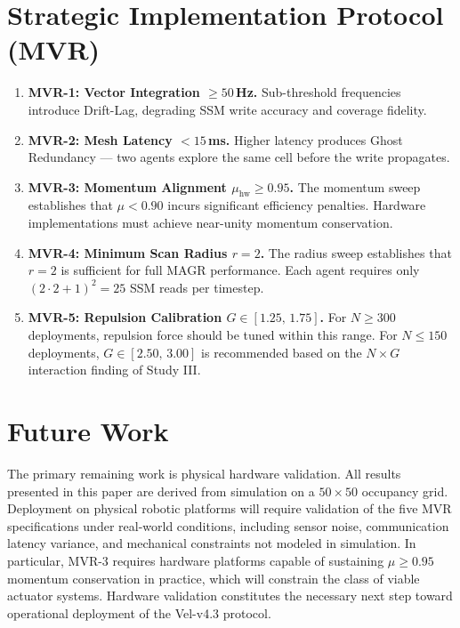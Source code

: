 \documentclass[journal,compsoc]{IEEEtran}
\begin{document}
\section{Strategic Implementation Protocol (MVR)}
\label{sec:mvr}

\begin{enumerate}
    \item \textbf{MVR-1: Vector Integration $\geq50$\,Hz.} Sub-threshold frequencies
          introduce Drift-Lag, degrading SSM write accuracy and coverage fidelity.
    \item \textbf{MVR-2: Mesh Latency $<15$\,ms.} Higher latency produces Ghost
          Redundancy --- two agents explore the same cell before the write propagates.
    \item \textbf{MVR-3: Momentum Alignment $\mu_{\text{hw}}\geq0.95$.} The momentum
          sweep establishes that $\mu<0.90$ incurs significant efficiency penalties.
          Hardware implementations must achieve near-unity momentum conservation.
    \item \textbf{MVR-4: Minimum Scan Radius $r=2$.} The radius sweep establishes
          that $r=2$ is sufficient for full MAGR performance. Each agent requires
          only $(2\cdot2+1)^2=25$ SSM reads per timestep.
    \item \textbf{MVR-5: Repulsion Calibration $G\in[1.25,\,1.75]$.} For $N\geq300$
          deployments, repulsion force should be tuned within this range. For
          $N\leq150$ deployments, $G\in[2.50,\,3.00]$ is recommended based on the
          $N\times G$ interaction finding of Study III.
\end{enumerate}

\section{Future Work}
\label{sec:future}

The primary remaining work is physical hardware validation. All results presented
in this paper are derived from simulation on a $50\times50$ occupancy grid.
Deployment on physical robotic platforms will require validation of the five MVR
specifications under real-world conditions, including sensor noise, communication
latency variance, and mechanical constraints not modeled in simulation. In particular,
MVR-3 requires hardware platforms capable of sustaining $\mu\geq0.95$ momentum
conservation in practice, which will constrain the class of viable actuator systems.
Hardware validation constitutes the necessary next step toward operational deployment
of the Vel-v4.3 protocol.
\end{document}
